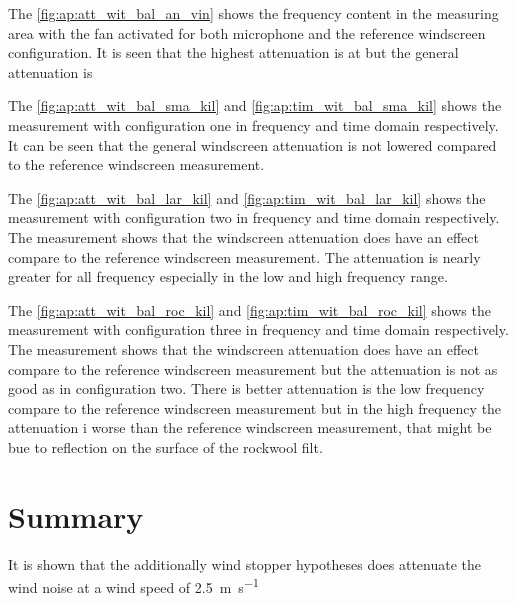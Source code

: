 The \autoref{fig:ap:att_wit_bal_an_vin} shows the frequency content in the measuring area with the fan activated for both microphone and the reference windscreen configuration. It is seen that the highest attenuation is at  but the general attenuation is 




The \autoref{fig:ap:att_wit_bal_sma_kil} and \autoref{fig:ap:tim_wit_bal_sma_kil} shows the measurement with configuration one in frequency and time domain respectively. It can be seen that the general windscreen attenuation is not lowered compared to the reference windscreen measurement.





The \autoref{fig:ap:att_wit_bal_lar_kil} and \autoref{fig:ap:tim_wit_bal_lar_kil} shows the measurement with configuration two in frequency and time domain respectively. The measurement shows that the windscreen attenuation does have an effect compare to the reference windscreen measurement. The attenuation is nearly greater for all frequency especially in the low and high frequency range.




The \autoref{fig:ap:att_wit_bal_roc_kil} and \autoref{fig:ap:tim_wit_bal_roc_kil} shows the measurement with configuration three in frequency and time domain respectively. The measurement shows that the windscreen attenuation does have an effect compare to the reference windscreen measurement but the attenuation is not as good as in configuration two. There is better attenuation is the low frequency compare to the reference windscreen measurement but in the high frequency the attenuation i worse than the reference windscreen measurement, that might be bue to reflection on the surface of the rockwool filt.


\section*{Summary}
It is shown that the additionally wind stopper hypotheses does attenuate the wind noise at a wind speed of \SI{2.5}{\meter\per\second}

